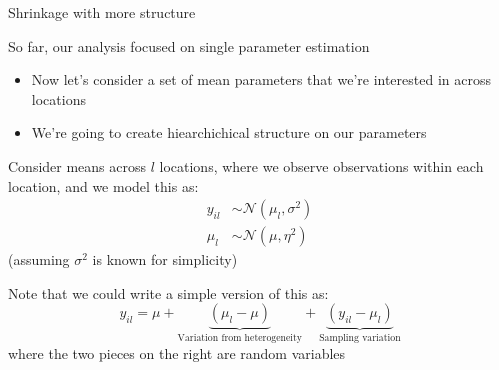 \documentclass[notes,11pt, aspectratio=169]{beamer}
\newenvironment{wideitemize}{\itemize\addtolength{\itemsep}{10pt}}{\enditemize}
\begin{document}
\begin{frame}{Shrinkage with more structure}
  \begin{wideitemize}
  \item So far, our analysis focused on single parameter estimation
    \begin{itemize}
    \item Now let's consider a set of mean parameters that we're interested in across locations
    \item We're going to create hiearchichical structure on our parameters
    \end{itemize}
  \item Consider means across $l$ locations, where we observe
    observations within each location, and we model this as:
    \begin{align*}
      y_{il} &\sim \mathcal{N}(\mu_{l}, \sigma^{2})\\
      \mu_{l} &\sim \mathcal{N}(\mu, \eta^{2})
    \end{align*}
    (assuming $\sigma^{2}$ is known for simplicity)
  \item Note that we could write a simple version of this as:
    \begin{equation*}
      y_{il} = \mu + \underbrace{(\mu_{l} - \mu)}_{\text{Variation from heterogeneity}} + \underbrace{(y_{il} - \mu_{l})}_{\text{Sampling variation}}
    \end{equation*}
    where the two pieces on the right are random variables
  \end{wideitemize}
\end{frame}
\end{document}
